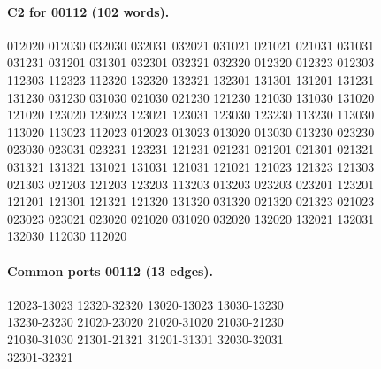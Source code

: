 \documentclass[11pt]{article}
\theoremstyle{remark}
\numberwithin{equation}{section}
\numberwithin{table}{section}
\begin{document}
\paragraph{C2 for 00112 (102 words).}
\begingroup\small\ttfamily\begin{flushleft}
012020 012030 032030 032031 032021 031021 021021 021031 031031\\
031231 031201 031301 032301 032321 032320 012320 012323 012303\\
112303 112323 112320 132320 132321 132301 131301 131201 131231\\
131230 031230 031030 021030 021230 121230 121030 131030 131020\\
121020 123020 123023 123021 123031 123030 123230 113230 113030\\
113020 113023 112023 012023 013023 013020 013030 013230 023230\\
023030 023031 023231 123231 121231 021231 021201 021301 021321\\
031321 131321 131021 131031 121031 121021 121023 121323 121303\\
021303 021203 121203 123203 113203 013203 023203 023201 123201\\
121201 121301 121321 121320 131320 031320 021320 021323 021023\\
023023 023021 023020 021020 031020 032020 132020 132021 132031\\
132030 112030 112020\\
\end{flushleft}\endgroup
\paragraph{Common ports 00112 (13 edges).}
\begingroup\small\ttfamily\begin{flushleft}
12023-13023 12320-32320 13020-13023 13030-13230\\
13230-23230 21020-23020 21020-31020 21030-21230\\
21030-31030 21301-21321 31201-31301 32030-32031\\
32301-32321\\
\end{flushleft}\endgroup
\end{document}
